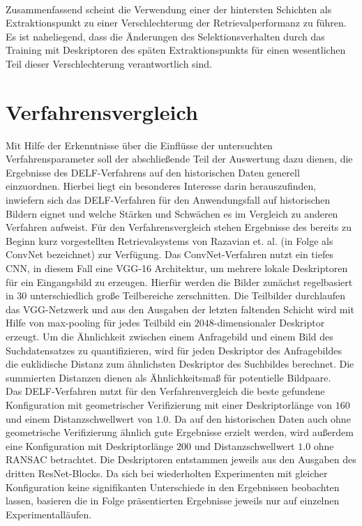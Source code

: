 \\
Zusammenfassend scheint die Verwendung einer der hintersten Schichten als Extraktionspunkt zu einer Verschlechterung der Retrievalperformanz zu führen. Es ist naheliegend, dass die Änderungen des Selektionsverhalten durch das Training mit Deskriptoren des späten Extraktionspunkts für einen wesentlichen Teil dieser Verschlechterung verantwortlich sind.

\section{Verfahrensvergleich}

Mit Hilfe der Erkenntnisse über die Einflüsse der untersuchten Verfahrensparameter soll der abschließende Teil der Auswertung dazu dienen, die Ergebnisse des DELF-Verfahrens auf den historischen Daten generell einzuordnen. Hierbei liegt ein besonderes Interesse darin herauszufinden, inwiefern sich das DELF-Verfahren für den Anwendungsfall auf historischen Bildern eignet und welche Stärken und Schwächen es im Vergleich zu anderen Verfahren aufweist. Für den Verfahrensvergleich stehen Ergebnisse des bereits zu Beginn kurz vorgestellten Retrievalsystems von Razavian et. al. \cite{convnet} (in Folge als ConvNet bezeichnet) zur Verfügung. Das ConvNet-Verfahren nutzt ein tiefes CNN, in diesem Fall eine VGG-16 Architektur, um mehrere lokale Deskriptoren für ein Eingangsbild zu erzeugen. Hierfür werden die Bilder zunächst regelbasiert in $30$ unterschiedlich große Teilbereiche zerschnitten. Die Teilbilder durchlaufen das VGG-Netzwerk und aus den Ausgaben der letzten faltenden Schicht wird mit Hilfe von max-pooling für jedes Teilbild ein $2048$-dimensionaler Deskriptor erzeugt. Um die Ähnlichkeit zwischen einem Anfragebild und einem Bild des Suchdatensatzes zu quantifizieren, wird für jeden Deskriptor des Anfragebildes die euklidische Distanz zum ähnlichsten Deskriptor des Suchbildes berechnet. Die summierten Distanzen dienen als Ähnlichkeitsmaß für potentielle Bildpaare.
\\
Das DELF-Verfahren nutzt für den Verfahrenvergleich die beste gefundene Konfiguration mit geometrischer Verifizierung mit einer Deskriptorlänge von $160$ und einem Distanzschwellwert von $1.0$. Da auf den historischen Daten auch ohne geometrische Verifizierung ähnlich gute Ergebnisse erzielt werden, wird außerdem eine Konfiguration mit Deskriptorlänge $200$ und Distanzschwellwert $1.0$ ohne RANSAC betrachtet. Die Deskriptoren entstammen jeweils aus den Ausgaben des dritten ResNet-Blocks. Da sich bei wiederholten Experimenten mit gleicher Konfiguration keine signifikanten Unterschiede in den Ergebnissen beobachten lassen, basieren die in Folge präsentierten Ergebnisse jeweils nur auf einzelnen Experimentalläufen.
